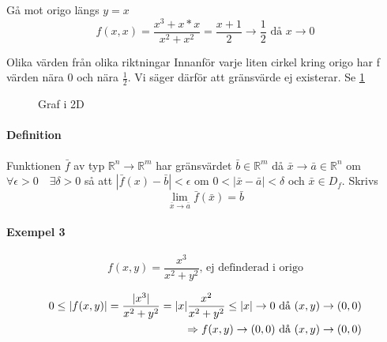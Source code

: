 \documentclass{article}
\DeclarePairedDelimiter \abs{\lvert}{\rvert}
\begin{document}
Gå mot origo längs $y=x$
\[f(x,x) = \frac{x^3+x*x}{x^2+x^2} = {\frac{x+1}{2} \rightarrow \frac{1}{2}} \text{ då } {x \rightarrow 0}\]

Olika värden från olika riktningar \newline
Innanför varje liten cirkel kring origo har f värden nära 0 och nära $\frac{1}{2}$.
Vi säger därför att gränsvärde ej existerar. Se \ref{fig:1}

\begin{figure}[ht] 
  \caption{Graf i 2D} \label{fig:1}
\end{figure}

\newpage
\paragraph{Definition}

Funktionen \(\bar{f}\) av typ \(\mathbb{R}^n \rightarrow \mathbb{R}^m\) har gränsvärdet \(\bar{b} \in \mathbb{R}^m\) då \(\bar{x} \rightarrow \bar{a} \in \mathbb{R}^n\) om \(\forall \epsilon >0 \quad \exists \delta >0\) så att \(|\bar{f}(x)-\bar{b}|<\epsilon\) om \(0<|\bar{x}-\bar{a}|<\delta\) och \(\bar{x}\in D_f\). 
Skrivs 
\[
\lim_{\bar{x} \rightarrow \bar{a}} \bar{f}(\bar{x})=\bar{b}
\]

\newpage
\paragraph{Exempel 3}
\begin{equation} \label{eq:3}
	f(x,y)=\frac{x^3}{x^2+y^2} \text{, ej definderad i origo}
\end{equation}

\[
\begin{split}
0 \leq \abs{f(x,y)} = \frac{\abs{x^3}}{x^2+y^2} = \abs{x}\frac{x^2}{x^2+y^2} \leq \abs{x} \rightarrow 0 \text{ då } (x,y) \rightarrow (0,0) \\
\Rightarrow f(x,y) \rightarrow (0,0) \text{ då } (x,y) \rightarrow (0,0)
\end{split}
\]
\end{document}
